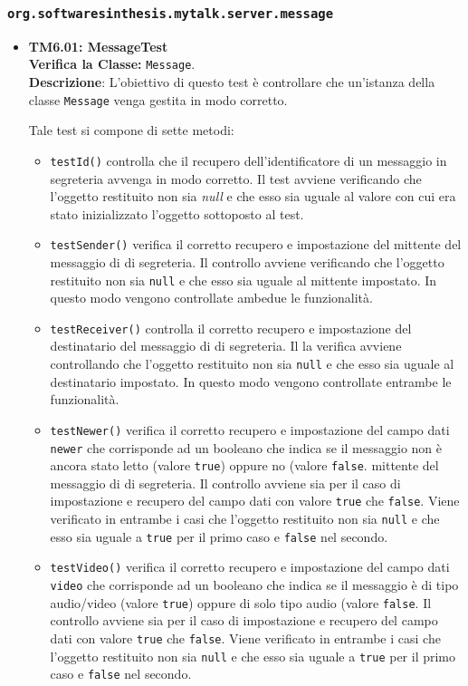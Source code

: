 \subsubsection{\texttt{org.softwaresinthesis.mytalk.server.message}}
\begin{itemize}

\item \textbf{TM6.01: MessageTest}\\
\textbf{Verifica la Classe:} \texttt{Message}.\\
\textbf{Descrizione}: L'obiettivo di questo test è controllare che un'istanza della classe \texttt{Message} venga gestita in modo corretto.

Tale test si compone di sette metodi:
\begin{itemize}
\item \texttt{testId()} controlla che il recupero dell'identificatore di un messaggio in segreteria avvenga in modo corretto. 
Il test avviene verificando che l'oggetto restituito non sia \textit{null} e che esso sia uguale al valore con cui era stato inizializzato l'oggetto sottoposto al test.
\item \texttt{testSender()} verifica il corretto recupero e impostazione del mittente del messaggio di di segreteria.
Il controllo avviene verificando che l'oggetto restituito non sia \texttt{null} e che esso sia uguale al mittente impostato. In questo modo vengono controllate ambedue le funzionalità.
\item \texttt{testReceiver()} controlla il corretto recupero e impostazione del destinatario del messaggio di di segreteria.
Il la verifica avviene controllando che l'oggetto restituito non sia \texttt{null} e che esso sia uguale al destinatario impostato. In questo modo vengono controllate entrambe le funzionalità. 

\item \texttt{testNewer()} verifica il corretto recupero e impostazione del campo dati \texttt{newer} che corrisponde ad un booleano che indica se il messaggio non è ancora stato letto (valore \texttt{true}) oppure no (valore \texttt{false}.  mittente del messaggio di di segreteria.
Il controllo avviene sia per il caso di impostazione e recupero del campo dati con valore 	\texttt{true} che 	\texttt{false}. Viene verificato in entrambe i casi che l'oggetto restituito non sia \texttt{null} e che esso sia uguale a \texttt{true} per il primo caso e \texttt{false} nel secondo.

\item \texttt{testVideo()}  verifica il corretto recupero e impostazione del campo dati \texttt{video} che corrisponde ad un booleano che indica se il messaggio è di tipo audio/video (valore \texttt{true}) oppure di solo tipo audio (valore \texttt{false}.
Il controllo avviene sia per il caso di impostazione e recupero del campo dati con valore 	\texttt{true} che 	\texttt{false}. Viene verificato in entrambe i casi che l'oggetto restituito non sia \texttt{null} e che esso sia uguale a \texttt{true} per il primo caso e \texttt{false} nel secondo.


\end{itemize}
\end{itemize}
